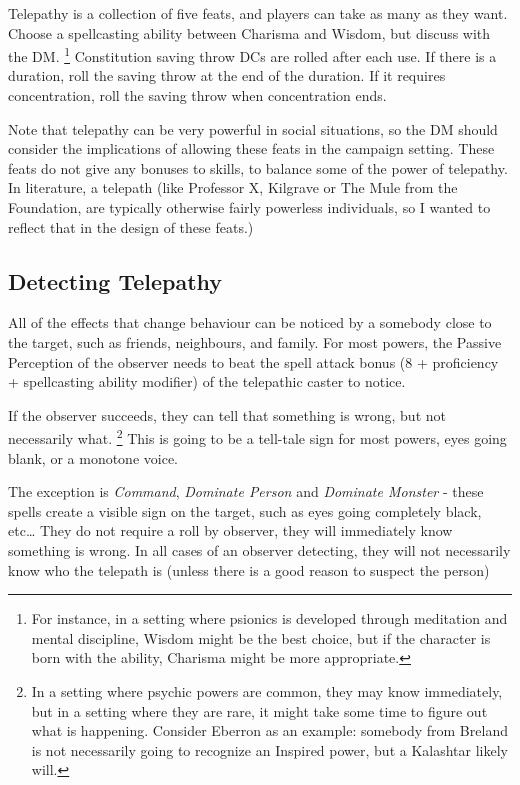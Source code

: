 \documentclass[twocolumn]{dndbook}
\begin{document}
Telepathy is a collection of five feats, and players can take as many as they want.
Choose a spellcasting ability between Charisma and Wisdom, but discuss with the DM.
\footnote{For instance, in a setting where psionics is developed through meditation and mental discipline, Wisdom might be the best choice, but if the character is born with the ability, Charisma might be more appropriate.}
Constitution saving throw DCs are rolled after each use.
If there is a duration, roll the saving throw at the end of the duration.
If it requires concentration, roll the saving throw when concentration ends.\par

Note that telepathy can be very powerful in social situations,
so the DM should consider the implications of allowing these feats in the campaign setting.
These feats do not give any bonuses to skills, to balance some of the power of telepathy.
In literature, a telepath (like Professor X, Kilgrave or The Mule from the Foundation, are typically otherwise fairly powerless individuals,
so I wanted to reflect that in the design of these feats.)\par


\subsection*{Detecting Telepathy}

All of the effects that change behaviour can be noticed by a somebody close to the target, such as friends, neighbours, and family.
For most powers, the Passive Perception of the observer needs to beat the spell attack bonus (8 + proficiency + spellcasting ability modifier) of the telepathic caster to notice.\par
If the observer succeeds, they can tell that something is wrong, but not necessarily what.
\footnote{In a setting where psychic powers are common, they may know immediately, but in a setting where they are rare, it might take some time to figure out what is happening. Consider Eberron as an example: somebody from Breland is not necessarily going to recognize an Inspired power, but a Kalashtar likely will.}
This is going to be a tell-tale sign for most powers, eyes going blank, or a monotone voice.\par

The exception is \emph{Command}, \emph{Dominate Person} and \emph{Dominate Monster} - these spells create a visible sign on the target, such as eyes going completely black, etc\dots
They do not require a roll by observer, they will immediately know something is wrong.
In all cases of an observer detecting, they will not necessarily know who the telepath is (unless there is a good reason to suspect the person)\par
\end{document}
